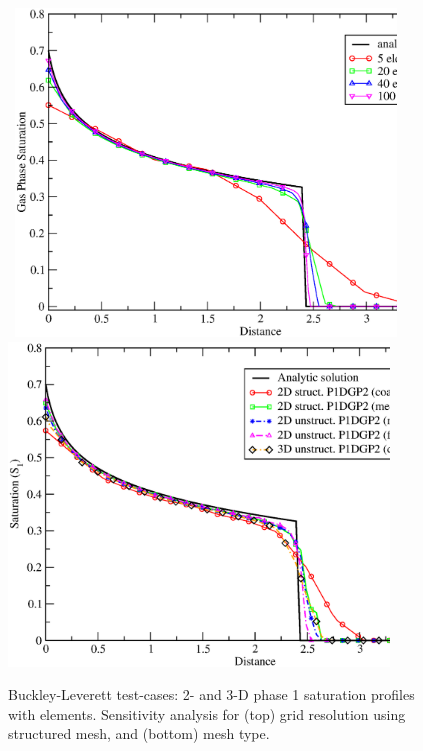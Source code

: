 \begin{figure}[h]
\vbox{\hbox{\hspace{.3cm}
    \includegraphics[width=0.9\textwidth]{diagrams/BL_2d_P1DGP2_convergence.eps}}
\vspace{-.0cm}\hbox{\hspace{.3cm}
    \includegraphics[width=0.9\textwidth]{./diagrams/simulations_2d_3d.eps}}}
    \caption{Buckley-Leverett test-cases: 2- and 3-D phase 1 saturation profiles with  elements. Sensitivity analysis for (top) grid resolution using structured  mesh, and (bottom) mesh type.\label{fig:BL_2d_profiles}}
\end{figure}




